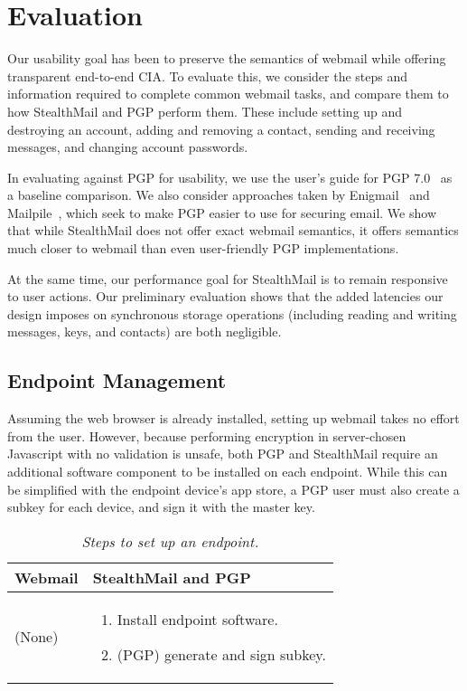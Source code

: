 \section{Evaluation}
\label{sec:evaluation}

Our usability goal has been to preserve the semantics of webmail while offering transparent end-to-end CIA.  To evaluate this, we consider the steps and information required to complete common webmail tasks, and compare them to how StealthMail and PGP perform them.  These include setting up and destroying an account, adding and removing a contact, sending and receiving messages, and changing account passwords.

In evaluating against PGP for usability, we use the user’s guide for PGP 7.0~\cite{pgp7} as a baseline comparison.  We also consider approaches taken by Enigmail~\cite{enigmail} and Mailpile~\cite{mailpile}, which seek to make PGP easier to use for securing email.  We show that while StealthMail does not offer exact webmail semantics, it offers semantics much closer to webmail than even user-friendly PGP implementations.

At the same time, our performance goal for StealthMail is to remain responsive to user actions.  Our preliminary evaluation shows that the added latencies our design imposes on synchronous storage operations (including reading and writing messages, keys, and contacts) are both negligible.

\subsection{Endpoint Management}
Assuming the web browser is already installed, setting up webmail takes no effort from the user.  However, because performing encryption in server-chosen Javascript with no validation is unsafe, both PGP and StealthMail require an additional software component to be installed on each endpoint.  While this can be simplified with the endpoint device's app store, a PGP user must also create a subkey for each device, and sign it with the master key.

\begin{table}[ht!]
\begin{tabular}{ | L{2.0cm} | L{4.5cm} |}
\hline
\textbf{Webmail} & \textbf{StealthMail and PGP} \\
\hline
(None) &

\vspace{-3mm} 
\begin{enumerate}
  \item{Install endpoint software.}
  \item{(PGP) generate and sign subkey.}
\end{enumerate} \\

\hline
\end{tabular}
\caption{\it Steps to set up an endpoint.}
\label{tab:account-creation}
\end{table}

